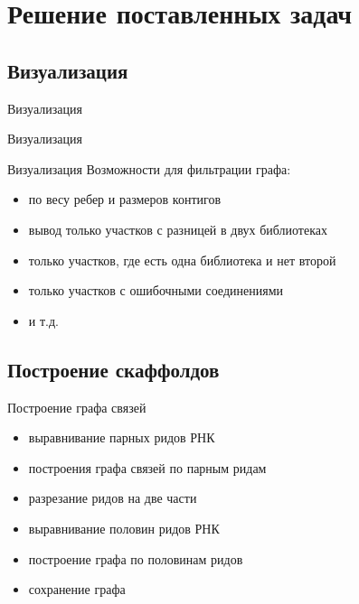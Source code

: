 \documentclass{beamer}
\newcommand{\cimg}[2]{%
	\begin{center}%
		\ifthenelse{\equal{#2}{}}{%
			\texttt{[image: \#1]}
		}{%
			\texttt{[image: \#1]}
		}%
	\end{center}%
}
\begin{document}
\section{Решение поставленных задач}
\subsection{Визуализация}

\begin{frame}[t]{Визуализация}
\cimg{examp.jpg}{0.8}
\end{frame}

\begin{frame}[t]{Визуализация}
	\cimg{diflib.png}{1.03}
\end{frame}


\begin{frame}[t]{Визуализация}
Возможности для фильтрации графа:
\begin{itemize}
	\item по весу ребер и размеров контигов
	\item вывод только участков с разницей в двух библиотеках
	\item только участков, где есть одна библиотека и нет второй 
	\item только участков с ошибочными соединениями
	\item и т.д.
\end{itemize}

\end{frame}

\subsection{Построение скаффолдов}

\begin{frame}[t]{Построение графа связей}
	\begin{itemize}
		\item выравнивание парных ридов РНК
		\item построения графа связей по парным ридам
		\item разрезание ридов на две части
		\item выравнивание половин ридов РНК
		\item построение графа по половинам ридов
		\item сохранение графа
	\end{itemize}
	\cimg{rnaReadsCon.png}{1}
\end{frame}
\end{document}

